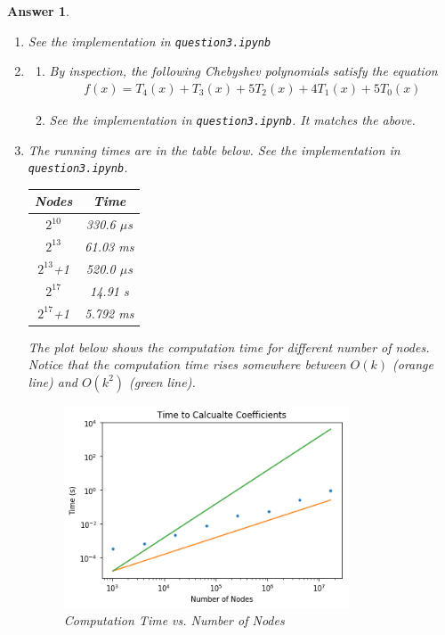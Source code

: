 \documentclass[12pt]{article}
\theoremstyle{colon}
\newtheorem*{answer}{Answer}
\begin{document}
\begin{answer}
  \begin{enumerate}[label=\alph*)]

    \item See the implementation in \texttt{question3.ipynb}

    \item
      \begin{enumerate}[label=\roman*)]
        \item By inspection, the following Chebyshev polynomials satisfy the equation
          \begin{gather*}
            f(x) = T_4(x) + T_3(x) + 5 T_2(x) + 4 T_1(x) + 5 T_0(x)
          \end{gather*}

        \item See the implementation in \texttt{question3.ipynb}. It matches the above.
      \end{enumerate}

    \item The running times are in the table below. See the implementation in \texttt{question3.ipynb}.
      \begin{center}
        \begin{tabular}{ c | c }
          Nodes & Time \\
          \hline
          $2^{10}$ & 330.6 $\mu$s \\
          $2^{13}$ & 61.03 ms \\
          $2^{13}$+1 & 520.0 $\mu$s \\
          $2^{17}$ & 14.91 s \\
          $2^{17}$+1 & 5.792 ms \\
        \end{tabular}
      \end{center}

      The plot below shows the computation time for different number of nodes. Notice that the computation time rises somewhere between $O(k)$ (orange line) and $O(k^2)$ (green line).
      \begin{figure}[H]
        \centering
          \includegraphics[width=0.8\textwidth]{q3c.png}
        \caption{Computation Time vs. Number of Nodes}
      \end{figure}
  \end{enumerate}
\end{answer}
\end{document}

